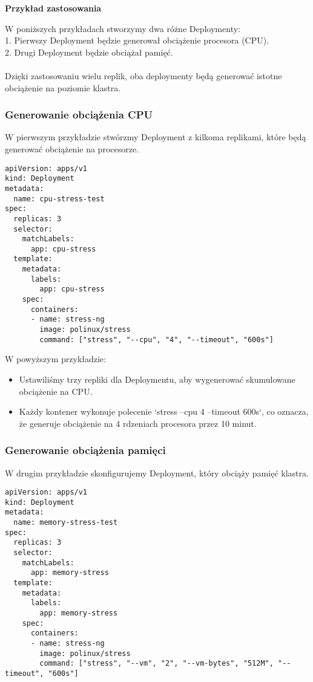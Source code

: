 \documentclass{article}
\begin{document}
\textbf{Przykład zastosowania}

W poniższych przykładach stworzymy dwa różne Deploymenty:\\
1. Pierwszy Deployment będzie generował obciążenie procesora (CPU).\\
2. Drugi Deployment będzie obciążał pamięć.\\
\\
Dzięki zastosowaniu wielu replik, oba deploymenty będą generować istotne obciążenie na poziomie klastra.

\subsubsection{Generowanie obciążenia CPU}

W pierwszym przykładzie stwórzmy Deployment z kilkoma replikami, które będą generować obciążenie na procesorze.

\begin{lstlisting}
apiVersion: apps/v1
kind: Deployment
metadata:
  name: cpu-stress-test
spec:
  replicas: 3
  selector:
    matchLabels:
      app: cpu-stress
  template:
    metadata:
      labels:
        app: cpu-stress
    spec:
      containers:
      - name: stress-ng
        image: polinux/stress
        command: ["stress", "--cpu", "4", "--timeout", "600s"]
\end{lstlisting}

W powyższym przykładzie:
\begin{itemize}
  \item Ustawiliśmy trzy repliki dla Deploymentu, aby wygenerować skumulowane obciążenie na CPU.
  \item Każdy kontener wykonuje polecenie `stress --cpu 4 --timeout 600s`, co oznacza, że generuje obciążenie na 4 rdzeniach procesora przez 10 minut.
\end{itemize}

\subsubsection{Generowanie obciążenia pamięci}

W drugim przykładzie skonfigurujemy Deployment, który obciąży pamięć klastra. 

\begin{lstlisting}
apiVersion: apps/v1
kind: Deployment
metadata:
  name: memory-stress-test
spec:
  replicas: 3
  selector:
    matchLabels:
      app: memory-stress
  template:
    metadata:
      labels:
        app: memory-stress
    spec:
      containers:
      - name: stress-ng
        image: polinux/stress
        command: ["stress", "--vm", "2", "--vm-bytes", "512M", "--timeout", "600s"]
\end{lstlisting}
\end{document}
